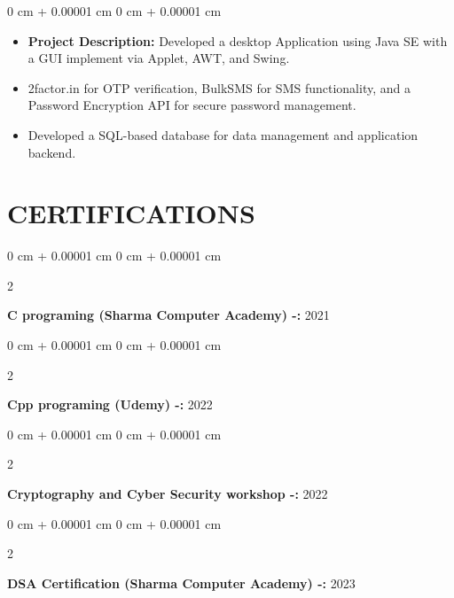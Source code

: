 \documentclass[10pt, letterpaper]{article}
\newenvironment{highlights}{
    \begin{itemize}[
        topsep=0.10 cm,
        parsep=0.10 cm,
        partopsep=0pt,
        itemsep=0pt,
        leftmargin=0 cm + 10pt
    ]
}{
    \end{itemize}
}
\newenvironment{onecolentry}{
    \begin{adjustwidth}{
        0 cm + 0.00001 cm
    }{
        0 cm + 0.00001 cm
    }
}{
    \end{adjustwidth}
}
\newenvironment{twocolentry}[2][]{
    \onecolentry
    \def\secondColumn{#2}
    \setcolumnwidth{\fill, 4.5 cm}
    \begin{paracol}{2}
}{
    \switchcolumn \raggedleft \secondColumn
    \end{paracol}
    \endonecolentry
}
\begin{document}
        \vspace{0.10 cm}
        \begin{onecolentry}
            \begin{highlights}
                 \item \textbf{Project Description:}  Developed a desktop Application using Java SE with a GUI
                 implement via Applet, AWT, and Swing.

              \item  2factor.in for OTP verification, BulkSMS for SMS functionality, and a Password Encryption API for secure password management.
              \item Developed a SQL-based database for data management and application backend.

            \end{highlights}
        \end{onecolentry}

   

    \section{\textcolor{highlightColor}{CERTIFICATIONS}}

        \begin{twocolentry} {}
            \textbf{C programing (Sharma Computer Academy) -:} 2021
            \end{twocolentry}

        \vspace{0.2 cm}

        \begin{twocolentry} {}
            \textbf{Cpp programing (Udemy) -:} 2022
            \end{twocolentry}

        \vspace{0.2 cm}

        \begin{twocolentry} {}
            \textbf{Cryptography and Cyber Security workshop -:} 2022
            \end{twocolentry}

        \vspace{0.2 cm}

        \begin{twocolentry} {}
            \textbf{DSA Certification (Sharma Computer Academy) -:} 2023
            \end{twocolentry}
\end{document}

